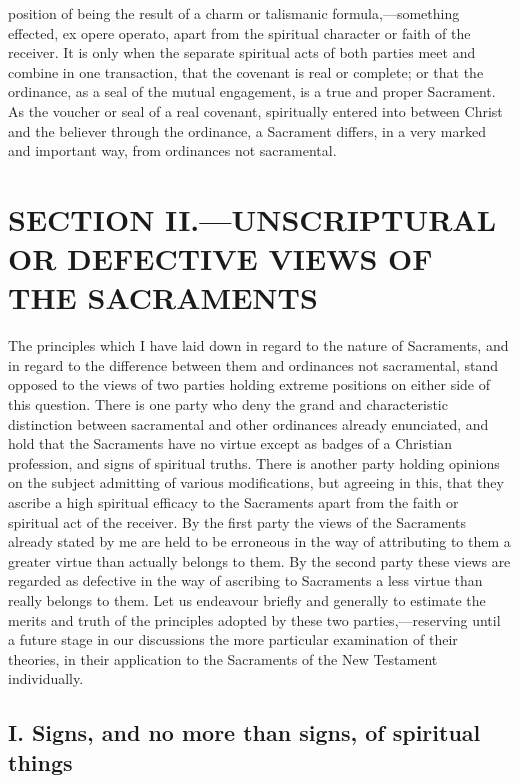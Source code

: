 \documentclass[]{book}
\begin{document}
position of being the result of a charm or talismanic formula,---something effected, ex opere operato, apart from the spiritual character or faith of the receiver. It is only when the separate spiritual acts of both parties meet and combine in one transaction, that the covenant is real or complete; or that the ordinance, as a seal of the mutual engagement, is a true and proper Sacrament. As the voucher or seal of a real covenant, spiritually entered into between Christ and the believer through the ordinance, a Sacrament differs, in a very marked and important way, from ordinances not sacramental.

\hypertarget{section-ii.unscriptural-or-defective-views-of-the-sacraments}{%
\section{SECTION II.---UNSCRIPTURAL OR DEFECTIVE VIEWS OF THE SACRAMENTS}\label{section-ii.unscriptural-or-defective-views-of-the-sacraments}}

The principles which I have laid down in regard to the nature of Sacraments, and in regard to the difference between them and ordinances not sacramental, stand opposed to the views of two parties holding extreme positions on either side of this question. There is one party who deny the grand and characteristic distinction between sacramental and other ordinances already enunciated, and hold that the Sacraments have no virtue except as badges of a Christian profession, and signs of spiritual truths. There is another party holding opinions on the subject admitting of various modifications, but agreeing in this, that they ascribe a high spiritual efficacy to the Sacraments apart from the faith or spiritual act of the receiver. By the first party the views of the Sacraments already stated by me are held to be erroneous in the way of attributing to them a greater virtue than actually belongs to them. By the second party these views are regarded as defective in the way of ascribing to Sacraments a less virtue than really belongs to them. Let us endeavour briefly and generally to estimate the merits and truth of the principles adopted by these two parties,---reserving until a future stage in our discussions the more particular examination of their theories, in their application to the Sacraments of the New Testament individually.

\hypertarget{i.-signs-and-no-more-than-signs-of-spiritual-things}{%
\subsection{I. Signs, and no more than signs, of spiritual things}\label{i.-signs-and-no-more-than-signs-of-spiritual-things}}
\end{document}

